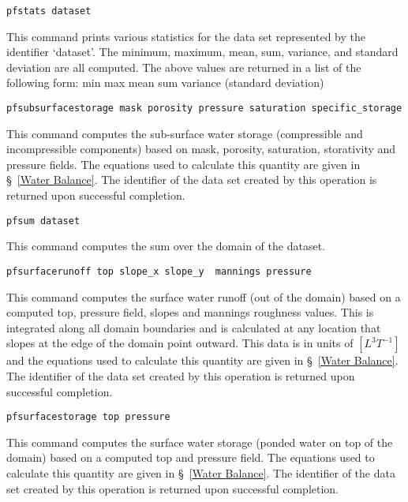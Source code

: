 \begin{description}
\item{\begin{verbatim}pfstats dataset\end{verbatim}}
This command prints various statistics for the data set represented by
the identifier `dataset'.  The minimum, maximum, mean, sum, variance,
and standard deviation are all computed.  The above values are
returned in a list of the following form:
{min max mean sum variance (standard deviation)}


\item{\begin{verbatim}pfsubsurfacestorage mask porosity pressure saturation specific_storage\end{verbatim}}
This command computes the sub-surface water storage (compressible and incompressible components) based on mask, porosity, saturation, storativity and pressure fields. The equations used to calculate this quantity are given in \S~\ref{Water Balance}. The identifier  
of the data set created by this operation is returned upon successful 
completion.  


\item{\begin{verbatim}pfsum dataset\end{verbatim}}
This command computes the sum over the domain of the dataset.


\item{\begin{verbatim}pfsurfacerunoff top slope_x slope_y  mannings pressure\end{verbatim}}
This command computes the surface water runoff (out of the domain) based
on a computed top, pressure field, slopes and mannings roughness values. 
This is integrated along all domain boundaries and is calculated at any location
that slopes at the edge of the domain point outward.  This data is in units of $[L^3 T^{-1}]$
and the equations used to calculate this quantity are given in \S~\ref{Water Balance}. 
The identifier  
of the data set created by this operation is returned upon successful 
completion.  
        

\item{\begin{verbatim}pfsurfacestorage top pressure\end{verbatim}}
This command computes the surface water storage (ponded water on top of the domain) based on a computed
top and pressure field. The equations used to calculate this quantity are given in \S~\ref{Water Balance}. The identifier  
of the data set created by this operation is returned upon successful 
completion.  



\end{description}
